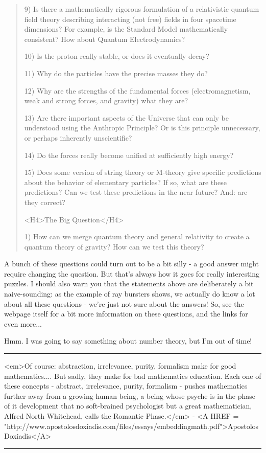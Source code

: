 \begin{quote}
 9) Is there a mathematically rigorous formulation of a relativistic 
    quantum field theory describing interacting (not free) fields in 
    four spacetime dimensions?  For example, is the Standard Model 
    mathematically consistent?  How about Quantum Electrodynamics?

 10) Is the proton really stable, or does it eventually decay?

 11) Why do the particles have the precise masses they do?
 
 12) Why are the strengths of the fundamental forces (electromagnetism, 
     weak and strong forces, and gravity) what they are?

 13) Are there important aspects of the Universe that can only be 
     understood using the Anthropic Principle?  Or is this principle 
     unnecessary, or perhaps inherently unscientific?

 14) Do the forces really become unified at sufficiently high energy?

 15) Does some version of string theory or M-theory give specific
     predictions about the behavior of elementary particles?   If 
     so, what are these predictions?  Can we test these predictions 
     in the near future?  And: are they correct?

 <H4>The Big Question</H4>

 1) How can we merge quantum theory and general relativity to create 
    a quantum theory of gravity?  How can we test this theory?

\end{quote}

A bunch of these questions could turn out to be a bit silly - a good
answer might require changing the question.  But that's always how it
goes for really interesting puzzles.  I should also warn you that the
statements above are deliberately a bit naive-sounding: as the example 
of \gamma  ray bursters shows, we actually do know a lot about all these 
questions - we're just not sure about the answers!  So, see the webpage 
itself for a bit more information on these questions, and the links for 
even more...

Hmm.  I was going to say something about number theory, but I'm out of 
time!

\par\noindent\rule{\textwidth}{0.4pt}
<em>Of course: abstraction, irrelevance, purity, formalism make for 
good mathematics....  But sadly, they make for bad mathematics education.
Each one of these concepts - abstract, irrelevance, purity, formalism -
pushes mathematics further away from a growing human being, a being
whose psyche is in the phase of it development that no soft-brained
psychologist but a great mathematician, Alfred North Whitehead, calls
the Romantic Phase.</em> - <A HREF = "http://www.apostolosdoxiadis.com/files/essays/embeddingmath.pdf">Apostolos Doxiadis</A>

\par\noindent\rule{\textwidth}{0.4pt}

